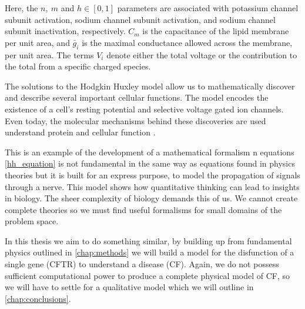 Here, the $n,\ m$ and $h \in [0,1]$ parameters are associated with potassium channel subunit activation, sodium channel subunit activation, and sodium channel subunit inactivation, respectively. $C_m$ is the capacitance of the lipid membrane per unit area, and $\bar{g}_i$ is the maximal conductance allowed across the membrane, per unit area. The terms $V_i$ denote either the total voltage or the contribution to the total from a specific charged species.

The solutions to the Hodgkin Huxley model allow us to mathematically discover and describe several important cellular functions. The model encodes the existence of a cell's resting potential and selective voltage gated ion channels. Even today, the molecular mechanisms behind these discoveries are used understand protein and cellular function \cite{}. 

This is an example of the development of a mathematical formalism n equations \ref{hh_equation} is not fundamental in the same way as equations found in physics theories but it is built for an express purpose, to model the propagation of signals through a nerve. This model shows how quantitative thinking can lead to insights in biology. The sheer complexity of biology demands this of us. We cannot create complete theories so we must find useful formalisms for small domains of the problem space.

In this thesis we aim to do something similar, by building up from fundamental physics outlined in \ref{chap:methods} we will build a model for the disfunction of a single gene (CFTR) to understand a disease (CF). Again, we do not possess sufficient computational power to produce a complete physical model of CF, so we will have to settle for a qualitative model which we will outline in \ref{chap:conclusions}. 


